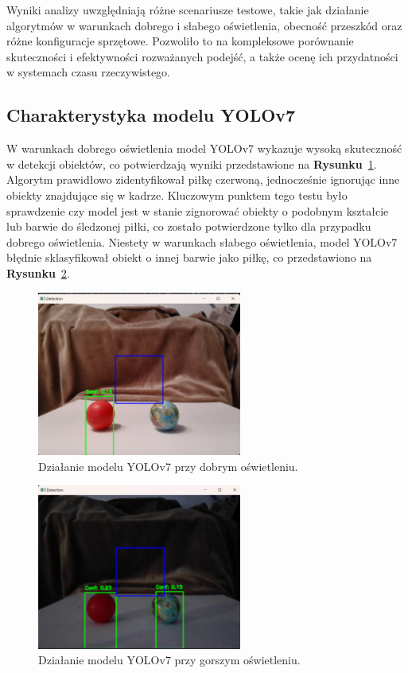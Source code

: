 \documentclass[a4paper,twoside,12pt]{book}
\begin{document}
Wyniki analizy uwzględniają różne scenariusze testowe, takie jak działanie algorytmów w warunkach dobrego i słabego oświetlenia, obecność przeszkód oraz różne konfiguracje sprzętowe. Pozwoliło to na kompleksowe porównanie skuteczności i efektywności rozważanych podejść, a także ocenę ich przydatności w systemach czasu rzeczywistego.


\newpage

\subsection{Charakterystyka modelu YOLOv7}

W warunkach dobrego oświetlenia model YOLOv7 wykazuje wysoką skuteczność w detekcji obiektów, co potwierdzają wyniki przedstawione na \textbf{Rysunku}~\ref{fig:yolov7_good_light}. Algorytm prawidłowo zidentyfikował piłkę czerwoną, jednocześnie ignorując inne obiekty znajdujące się w kadrze. Kluczowym punktem tego testu było sprawdzenie czy model jest w stanie zignorować obiekty o podobnym kształcie lub barwie do śledzonej piłki, co zostało potwierdzone tylko dla przypadku dobrego oświetlenia. Niestety w warunkach słabego oświetlenia, model YOLOv7 błędnie sklasyfikował obiekt o innej barwie jako piłkę, co przedstawiono na \textbf{Rysunku}~\ref{fig:yolov7_bad_light}.

\begin{figure}[h]
    \centering
    \includegraphics[width=0.6\textwidth]{Images/Porownanie/Yolo7 robot/Zrzut ekranu 2025-01-02 194147.png}
    \caption{Działanie modelu YOLOv7 przy dobrym oświetleniu.}
    \label{fig:yolov7_good_light}
\end{figure}
\begin{figure}[h]
    \centering
    \includegraphics[width=0.6\textwidth]{Images/Porownanie/Yolo7 robot/Zrzut ekranu 2025-01-02 194208.png}
    \caption{Działanie modelu YOLOv7 przy gorszym oświetleniu.}
    \label{fig:yolov7_bad_light}
\end{figure}
\end{document}
